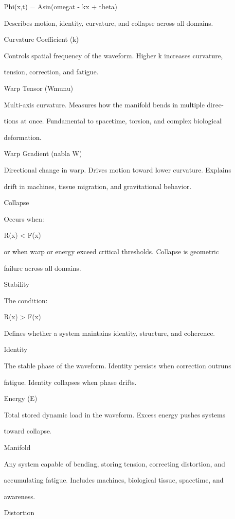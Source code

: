 \documentclass[10pt]{article}
\begin{document}
Phi(x,t) = Asin(omegat - kx + theta)

Describes motion, identity, curvature, and collapse across all domains.

Curvature Coefficient (k)

Controls spatial frequency of the waveform. Higher k increases curvature,

tension, correction, and fatigue.

Warp Tensor (Wmunu)

Multi-axis curvature. Measures how the manifold bends in multiple direc-

tions at once. Fundamental to spacetime, torsion, and complex biological

deformation.

Warp Gradient (nabla W)

Directional change in warp. Drives motion toward lower curvature. Explains

drift in machines, tissue migration, and gravitational behavior.


Collapse

Occurs when:

R(x) < F(x)

or when warp or energy exceed critical thresholds. Collapse is geometric

failure across all domains.

Stability

The condition:

R(x) > F(x)

Defines whether a system maintains identity, structure, and coherence.

Identity

The stable phase of the waveform. Identity persists when correction outruns

fatigue. Identity collapses when phase drifts.

Energy (E)

Total stored dynamic load in the waveform. Excess energy pushes systems

toward collapse.

Manifold

Any system capable of bending, storing tension, correcting distortion, and

accumulating fatigue. Includes machines, biological tissue, spacetime, and

awareness.

Distortion
\end{document}
